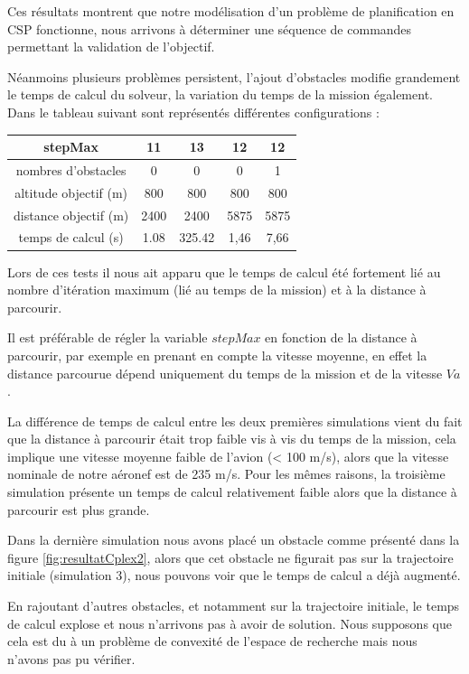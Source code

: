 Ces résultats montrent que notre modélisation d'un problème de planification en CSP fonctionne, nous arrivons à déterminer une séquence de commandes permettant la validation de l'objectif.

Néanmoins plusieurs problèmes persistent, l'ajout d'obstacles modifie grandement le temps de calcul du solveur, la variation du temps de la mission également. Dans le tableau suivant sont représentés différentes configurations : 
\begin{center}
\begin{tabular}{|c|c|c|c|c|}
	\hline stepMax & 11 & 13 & 12 & 12 \\ 
	\hline nombres d'obstacles & 0 & 0 & 0 & 1 \\ 
	\hline altitude objectif (m) & 800 & 800 & 800 & 800 \\ 
	\hline distance objectif (m) & 2400 & 2400 & 5875 & 5875 \\ 
	\hline\hline temps de calcul (s) & 1.08 & 325.42 & 1,46 & 7,66 \\ 
	\hline 
\end{tabular} 
\end{center}

Lors de ces tests il nous ait apparu que le temps de calcul été fortement lié au nombre d'itération maximum (lié au temps de la mission) et à la distance à parcourir.

Il est préférable de régler la variable $stepMax$ en fonction de la distance à parcourir, par exemple en prenant en compte la vitesse moyenne, en effet la distance parcourue dépend uniquement du temps de la mission et de la vitesse $Va$. 

La différence de temps de calcul entre les deux premières simulations vient du fait que la distance à parcourir était trop faible vis à vis du temps de la mission, cela implique une vitesse moyenne faible de l'avion (< 100 m/s), alors que la vitesse nominale de notre aéronef est de 235 m/s.
Pour les mêmes raisons, la troisième simulation présente un temps de calcul relativement faible alors que la distance à parcourir est plus grande.

Dans la dernière simulation nous avons placé un obstacle comme présenté dans la figure \ref{fig:resultatCplex2}, alors que cet obstacle ne figurait pas sur la trajectoire initiale (simulation 3), nous pouvons voir que le temps de calcul a déjà augmenté.

En rajoutant d'autres obstacles, et notamment sur la trajectoire initiale, le temps de calcul explose et nous n'arrivons pas à avoir de solution. Nous supposons que cela est du à un problème de convexité de l'espace de recherche mais nous n'avons pas pu vérifier.

